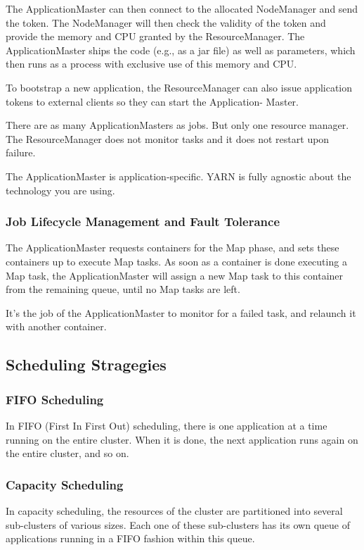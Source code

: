 The ApplicationMaster can then connect to the allocated NodeManager and send the token. The NodeManager will then check the validity of the token and provide the memory and CPU granted by the ResourceManager. The ApplicationMaster ships the code (e.g., as a jar file) as well as parameters, which then runs as a process with exclusive use of this memory and CPU.

To bootstrap a new application, the ResourceManager can also issue application tokens to external clients so they can start the Application- Master.

There are as many ApplicationMasters as jobs. But only one resource manager. The ResourceManager does not monitor tasks and it does not restart upon failure.

The ApplicationMaster is application-specific. YARN is fully agnostic about the technology you are using.

\subsubsection{Job Lifecycle Management and Fault Tolerance}

The ApplicationMaster requests containers for the Map phase, and sets these containers up to execute Map tasks. As soon as a container is done executing a Map task, the ApplicationMaster will assign a new Map task to this container from the remaining queue, until no Map tasks are left.

It's the job of the ApplicationMaster to monitor for a failed task, and relaunch it with another container.


\subsection{Scheduling Stragegies}

\subsubsection{FIFO Scheduling}
In FIFO (First In First Out) scheduling, there is one application at a time running on the entire cluster. When it is done, the next application runs again on the entire cluster, and so on.

\subsubsection{Capacity Scheduling}
In capacity scheduling, the resources of the cluster are partitioned into several sub-clusters of various sizes. Each one of these sub-clusters has its own queue of applications running in a FIFO fashion within this queue.

